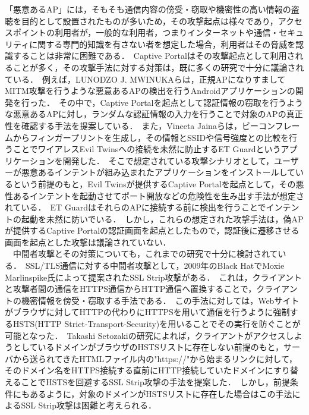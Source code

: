 \documentclass[dvipdfmx,twocolumn]{jsarticle}
\begin{document}
        「悪意あるAP」には，そもそも通信内容の傍受・窃取や機密性の高い情報の盗聴を目的として設置されたものが多いため，その攻撃起点は様々であり，アクセスポイントの利用者が，一般的な利用者，つまりインターネットや通信・セキュリティに関する専門的知識を有さない者を想定した場合，利用者はその脅威を認識することは非常に困難である．\
        Captive Portalはその攻撃起点として利用されることが多く，その攻撃手法に対する対策は，既に多くの研究で十分に議論されている．\
        例えば，LUNODZO J. MWINUKAらは，正規APになりすましてMITM攻撃を行うような悪意あるAPの検出を行うAndroidアプリケーションの開発を行った\cite{FakeAP}．\
        その中で，Captive Portalを起点として認証情報の窃取を行うような悪意あるAPに対し，ランダムな認証情報の入力を行うことで対象のAPの真正性を確認する手法を提案している．\
        また，Vineeta Jainaらは，ビーコンフレームからフィンガープリントを生成し，その情報とSSIDや信号強度との比較を行うことでワイアレスEvil Twinsへの接続を未然に防止するET Guardというアプリケーションを開発した\cite{ETGuard}．\
        そこで想定されている攻撃シナリオとして，ユーザーが悪意あるインテントが組み込まれたアプリケーションをインストールしているという前提のもと，Evil Twinsが提供するCaptive Portalを起点として，その悪性あるインテントを起動させてポート開放などの危険性を生み出す手法が想定されている．\
        ET GuardはそれらのAPに接続する前に検出を行うことでインテントの起動を未然に防いでいる．\
        しかし，これらの想定された攻撃手法は，偽APが提供するCaptive Portalの認証画面を起点としたもので，認証後に遷移させる画面を起点とした攻撃は議論されていない．\\
        　中間者攻撃とその対策についても，これまでの研究で十分に検討されている．\
        SSL/TLS通信に対する中間者攻撃として，2009年のBlack HatでMoxie Marlinspike氏によって提案されたSSL Strip攻撃がある\cite{SslStrip}．\
        これは，クライアントと攻撃者間の通信をHTTPS通信からHTTP通信へ置換することで，クライアントの機密情報を傍受・窃取する手法である．\
        この手法に対しては，Webサイトがブラウザに対してHTTPの代わりにHTTPSを用いて通信を行うように強制するHSTS(HTTP Strict-Transport-Security)を用いることでその実行を防ぐことが可能となった．\
        Takashi Setozakiの研究\cite{HSTS}によれば，クライアントがアクセスしようとしているドメインがブラウザのHSTSリストに存在しない前提のもと，サーバから送られてきたHTMLファイル内の"https://"から始まるリンクに対して，そのドメイン名をHTTPS接続する直前にHTTP接続していたドメインにすり替えることでHSTSを回避するSSL Strip攻撃の手法を提案した．\
        しかし，前提条件にもあるように，対象のドメインがHSTSリストに存在した場合はこの手法によるSSL Strip攻撃は困難と考えられる．\
\end{document}
